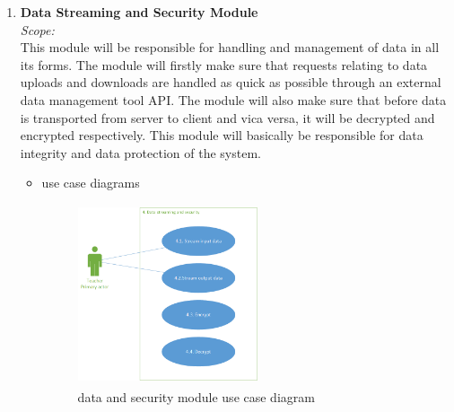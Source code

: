 \documentclass{article}
\begin{document}
\begin{enumerate}
			\item \textbf {Data Streaming and Security Module}\\
					\textit{Scope:}\\
					This module will be responsible for handling and management of data in all its forms. The module will firstly make sure that requests relating to data uploads and downloads are handled as quick as possible through an external data management tool API. The module will also make sure that before data is transported from server to client and vica versa, it will be decrypted and encrypted respectively. This module will basically be responsible for data integrity and data protection of the system.  \\
			\begin{itemize}
								\item use case diagrams\\
								\begin{figure}[h]
								\includegraphics[width=200px, height=200px, inner]{data_and_security.png}
								\caption{data and security module use case diagram}
								\end{figure}
					\end{itemize}
			

\end{enumerate}
\end{document}
